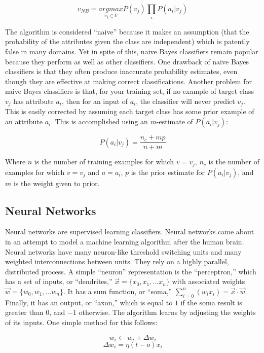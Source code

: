 \[v_{NB}=\underset{v_j \in V}{argmax}P(v_j)\prod_{i}P(a_i|v_j)\]

The algorithm is considered ``naive'' because it makes an assumption (that the probability of the attributes given the class are independent) which is patently false in many domains. Yet in spite of this, naive Bayes classifiers remain popular because they perform as well as other classifiers. One drawback of naive Bayes classifiers is that they often produce inaccurate probability estimates, even though they are effective at making correct classifications. Another problem for naive Bayes classifiers is that, for your training set, if no example of target class \(v_j\) has attribute \(a_i\), then for an input of \(a_i\), the classifier will never predict \(v_j\). This is easily corrected by assuming each target class has some prior example of an attribute \(a_i\). This is accomplished using an \(m\)-estimate of \(P(a_i|v_j)\):

\[P(a_i|v_j) = \frac{n_c+mp}{n+m}\]

Where \(n\) is the number of training examples for which \(v=v_j\), \(n_c\) is the number of examples for which \(v=v_j\) and \(a=a_i\), \(p\) is the prior estimate for \(P(a_i|v_j)\), and \(m\) is the weight given to prior. \cite{website:domingos} 


\subsection{Neural Networks}

Neural networks are supervised learning classifiers. Neural networks came about in an attempt to model a machine learning algorithm after the human brain. Neural networks have many neuron-like threshold switching units and many weighted interconnections between units. They rely on a highly parallel, distributed process. \cite{website:domingos} A simple ``neuron'' representation is the ``perceptron,'' which has a set of inputs, or ``dendrites,'' \(\vec{x}=\{x_0, x_1, ... x_n\}\) with associated weights \(\vec{w}=\{w_0, w_1, ... w_n\}\). It has a sum function, or ``soma,'' \(\sum_{i=0}^{n}(w_ix_i)=\vec{x}\dot\cdot\vec{w}\). Finally, it has an output, or ``axon,'' which is equal to \(1\) if the soma result is greater than \(0\), and \(-1\) otherwise. The algorithm learns by adjusting the weights of its inputs. One simple method for this follows:

\[w_i \leftarrow w_i + \Delta w_i\]
\[\Delta w_i = \eta (t - o) x_i\]

